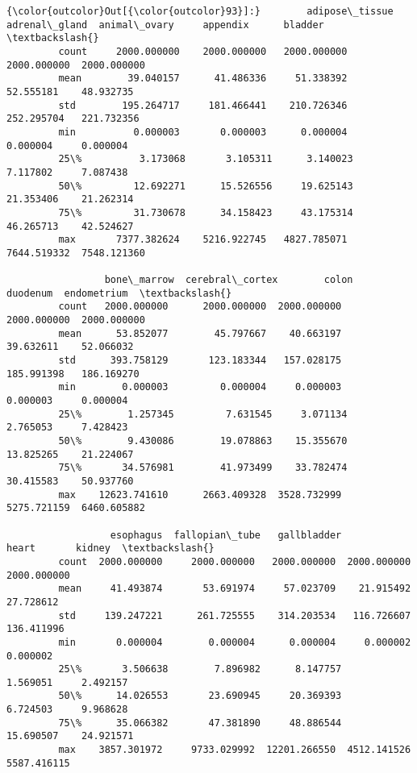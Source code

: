 \documentclass[11pt]{article}
\begin{document}
\begin{Verbatim}[commandchars=\\\{\}]
{\color{outcolor}Out[{\color{outcolor}93}]:}        adipose\_tissue  adrenal\_gland  animal\_ovary     appendix      bladder  \textbackslash{}
         count     2000.000000    2000.000000   2000.000000  2000.000000  2000.000000   
         mean        39.040157      41.486336     51.338392    52.555181    48.932735   
         std        195.264717     181.466441    210.726346   252.295704   221.732356   
         min          0.000003       0.000003      0.000004     0.000004     0.000004   
         25\%          3.173068       3.105311      3.140023     7.117802     7.087438   
         50\%         12.692271      15.526556     19.625143    21.353406    21.262314   
         75\%         31.730678      34.158423     43.175314    46.265713    42.524627   
         max       7377.382624    5216.922745   4827.785071  7644.519332  7548.121360   
         
                 bone\_marrow  cerebral\_cortex        colon     duodenum  endometrium  \textbackslash{}
         count   2000.000000      2000.000000  2000.000000  2000.000000  2000.000000   
         mean      53.852077        45.797667    40.663197    39.632611    52.066032   
         std      393.758129       123.183344   157.028175   185.991398   186.169270   
         min        0.000003         0.000004     0.000003     0.000003     0.000004   
         25\%        1.257345         7.631545     3.071134     2.765053     7.428423   
         50\%        9.430086        19.078863    15.355670    13.825265    21.224067   
         75\%       34.576981        41.973499    33.782474    30.415583    50.937760   
         max    12623.741610      2663.409328  3528.732999  5275.721159  6460.605882   
         
                  esophagus  fallopian\_tube   gallbladder        heart       kidney  \textbackslash{}
         count  2000.000000     2000.000000   2000.000000  2000.000000  2000.000000   
         mean     41.493874       53.691974     57.023709    21.915492    27.728612   
         std     139.247221      261.725555    314.203534   116.726607   136.411996   
         min       0.000004        0.000004      0.000004     0.000002     0.000002   
         25\%       3.506638        7.896982      8.147757     1.569051     2.492157   
         50\%      14.026553       23.690945     20.369393     6.724503     9.968628   
         75\%      35.066382       47.381890     48.886544    15.690507    24.921571   
         max    3857.301972     9733.029992  12201.266550  4512.141526  5587.416115   
         

\end{Verbatim}
\end{document}
